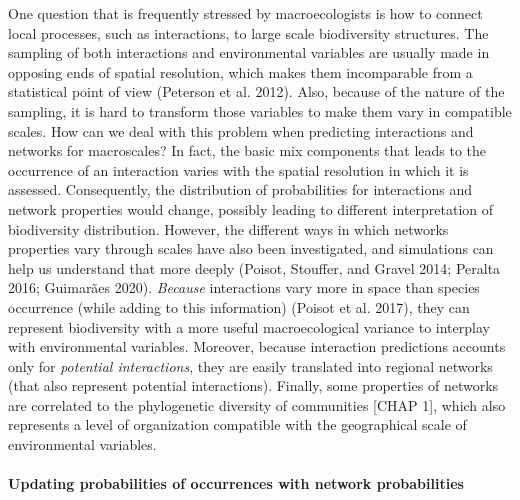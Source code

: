 \documentclass[12pt]{article}
\begin{document}
One question that is frequently stressed by macroecologists is how to
connect local processes, such as interactions, to large scale
biodiversity structures. The sampling of both interactions and
environmental variables are usually made in opposing ends of spatial
resolution, which makes them incomparable from a statistical point of
view (Peterson et al. 2012). Also, because of the nature of the
sampling, it is hard to transform those variables to make them vary in
compatible scales. How can we deal with this problem when predicting
interactions and networks for macroscales? In fact, the basic mix
components that leads to the occurrence of an interaction varies with
the spatial resolution in which it is assessed. Consequently, the
distribution of probabilities for interactions and network properties
would change, possibly leading to different interpretation of
biodiversity distribution. However, the different ways in which networks
properties vary through scales have also been investigated, and
simulations can help us understand that more deeply (Poisot, Stouffer,
and Gravel 2014; Peralta 2016; Guimarães 2020). \emph{Because}
interactions vary more in space than species occurrence (while adding to
this information) (Poisot et al. 2017), they can represent biodiversity
with a more useful macroecological variance to interplay with
environmental variables. Moreover, because interaction predictions
accounts only for \emph{potential interactions}, they are easily
translated into regional networks (that also represent potential
interactions). Finally, some properties of networks are correlated to
the phylogenetic diversity of communities {[}CHAP 1{]}, which also
represents a level of organization compatible with the geographical
scale of environmental variables.

\hypertarget{updating-probabilities-of-occurrences-with-network-probabilities}{%
\paragraph{Updating probabilities of occurrences with network
probabilities}\label{updating-probabilities-of-occurrences-with-network-probabilities}}
\end{document}
